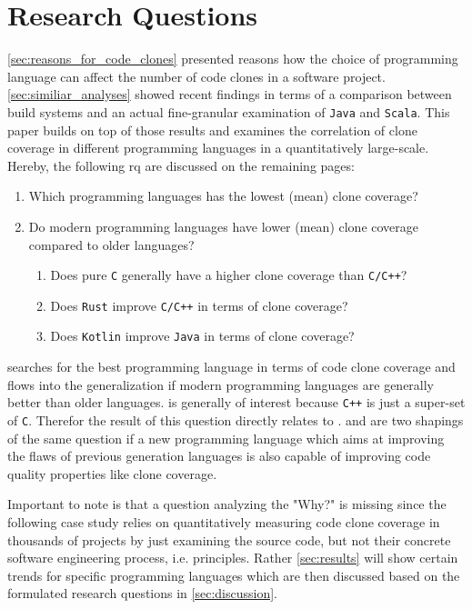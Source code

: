 
\section{Research Questions}
\label{sec:research_question}

\autoref{sec:reasons_for_code_clones} presented reasons how the choice of programming language can affect the number of code clones in a software project. \autoref{sec:similiar_analyses} showed recent findings in terms of a comparison between build systems and an actual fine-granular examination of \texttt{Java} and \texttt{Scala}.
This paper builds on top of those results and examines the correlation of clone coverage in different programming languages in a quantitatively large-scale. Hereby, the following \ac{rq} are discussed on the remaining pages:

\begin{enumerate}
	\item Which programming languages has the lowest (mean) clone coverage? \label{question:clone_coverage_lowest}
	\item Do modern programming languages have lower (mean) clone coverage compared to older languages? \label{question:comparing_age}
	\begin{enumerate}
		\item Does pure \texttt{C} generally have a higher clone coverage than \texttt{C/C++}? \label{question:compare_c_cpp}
		\item Does \texttt{Rust} improve \texttt{C/C++} in terms of clone coverage? \label{question:compare_rust_c}
		\item Does \texttt{Kotlin} improve \texttt{Java} in terms of clone coverage? \label{question:compare_kotlin_java}
	\end{enumerate}
\end{enumerate}

 searches for the best programming language in terms of code clone coverage and flows into the generalization if modern programming languages are generally better than older languages.
 is generally of interest because \texttt{C++} is just a super-set of \texttt{C}. Therefor the result of this question directly relates to .  and  are two shapings of the same question if a new programming language which aims at improving the flaws of previous generation languages is also capable of improving code quality properties like clone coverage.

Important to note is that a question analyzing the "Why?" is missing since the following case study relies on quantitatively measuring code clone coverage in thousands of projects by just examining the source code, but not their concrete software engineering process, i.e. principles. Rather \autoref{sec:results} will show certain trends for specific programming languages which are then discussed based on the formulated research questions in \autoref{sec:discussion}.